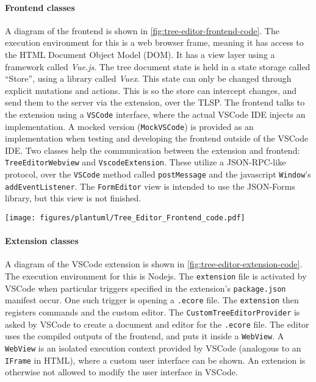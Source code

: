 \paragraph{Frontend classes}
A diagram of the frontend is shown in \cref{fig:tree-editor-frontend-code}.
The execution environment for this is a web browser frame, meaning it has access to the HTML Document Object Model (DOM).
It has a view layer using a framework called \textit{Vue.js}.
The tree document state is held in a state storage called ``Store'', using a library called \textit{Vuex}.
This state can only be changed through explicit mutations and actions.
This is so the store can intercept changes, and send them to the server via the extension, over the \acrlong{TLSP}.
The frontend talks to the extension using a \texttt{VSCode} interface, where the actual \gls{VSCode} \acrshort{IDE} injects an implementation.
A mocked version (\texttt{MockVSCode}) is provided as an implementation when testing and developing the frontend outside of the \gls{VSCode} \acrshort{IDE}.
Two classes help the communication between the extension and frontend: \texttt{TreeEditorWebview} and \texttt{VscodeExtension}.
These utilize a \gls{JSON-RPC}-like protocol, over the \texttt{VSCode} method called \texttt{postMessage} and the javascript \texttt{Window}'s \texttt{addEventListener}.
The \texttt{FormEditor} view is intended to use the JSON-Forms library, but this view is not finished.

\begin{sidewaysfigure}[htbp]  %
  \centering
  \texttt{[image: figures/plantuml/Tree\_Editor\_Frontend\_code.pdf]}
  \caption[Tree Editor Frontend class diagram]{Class diagram of the Tree Editor Frontend component.}\label{fig:tree-editor-frontend-code}
\end{sidewaysfigure}

\FloatBarrier

\paragraph{Extension classes}
A diagram of the \gls{VSCode} extension is shown in \cref{fig:tree-editor-extension-code}.
The execution environment for this is \gls{Nodejs}.
The \texttt{extension} file is activated by \gls{VSCode} when particular triggers specified in the extension's \texttt{package.json} manifest occur.
One such trigger is opening a \texttt{.ecore} file.
The \texttt{extension} then registers commands and the custom editor.
The \texttt{CustomTreeEditorProvider} is asked by \gls{VSCode} to create a document and editor for the \texttt{.ecore} file.
The editor uses the compiled outputs of the frontend, and puts it inside a \texttt{WebView}.
A \texttt{WebView} is an isolated execution context provided by \gls{VSCode} (analogous to an \texttt{IFrame} in HTML), where a custom user interface can be shown.
An extension is otherwise not allowed to modify the user interface in \gls{VSCode}.\\

